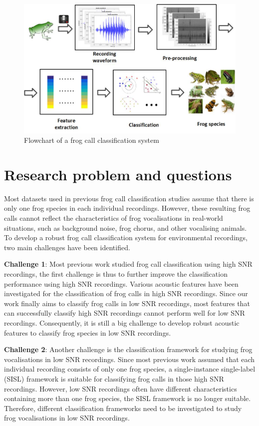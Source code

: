 \begin{figure}[htb!]
\centering
\includegraphics[width=\textwidth]{image/Ch1/flowchart.jpg}
\caption[Flowchart of a frog call classification system]{Flowchart of a frog call classification system}
\label{fig:Ch1_flowchart}
\end{figure}


\section{Research problem and questions}
Most datasets used in previous frog call classification studies assume that there is only one frog species in each individual recordings. However, these resulting frog calls cannot reflect the characteristics of frog vocalisations in real-world situations, such as background noise, frog chorus, and other vocalising animals. To develop a robust frog call classification system for environmental recordings, two main challenges have been identified. 


\noindent \textbf{Challenge 1}: Most previous work studied frog call classification using high SNR recordings, the first challenge is thus to further improve the classification performance using high SNR recordings. Various acoustic features have been investigated for the classification of frog calls in high SNR recordings. Since our work finally aims to classify frog calls in low SNR recordings, most features that can successfully classify high SNR recordings cannot perform well for low SNR recordings. Consequently, it is still a big challenge to develop robust acoustic features to classify frog species in low SNR recordings. 

\noindent \textbf{Challenge 2}: Another challenge is the classification framework for studying frog vocalisations in low SNR recordings. Since most previous work assumed that each individual recording consists of only one frog species, a single-instance single-label (SISL) framework is suitable for classifying frog calls in those high SNR recordings. However, low SNR recordings often have different characteristics containing more than one frog species, the SISL framework is no longer suitable. Therefore, different classification frameworks need to be investigated to study frog vocalisations in low SNR recordings.



